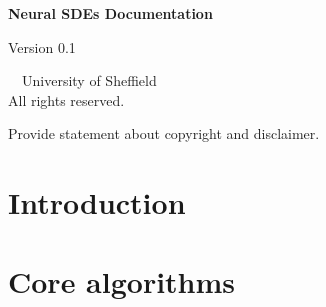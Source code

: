 \documentclass[11pt,a4paper,oneside]{report}
\newcommand{\cleartoleftpage}{%
  \clearpage
  \ifodd\value{page}\hbox{}\newpage\fi
}
\begin{document}
\begin{titlepage}
    \centering
    \vspace*{4cm}
    {\Huge\bfseries Neural SDEs Documentation\par}
    \vspace{1cm}
    {\Large Version 0.1\par}
    \vfill
    {\Large\textcopyright~\the\year~University of Sheffield\\
    All rights reserved.\par}
    \vspace{0.5cm}
\end{titlepage}

\cleartoleftpage

\thispagestyle{empty}
\vspace*{\fill}
\noindent
Provide statement about copyright and disclaimer.
\cleartoleftpage

\tableofcontents
\cleartoleftpage

\listoffigures
\cleartoleftpage

\chapter{Introduction}

\chapter{Core algorithms}

\begin{algorithm}[H]
\caption{Example Sorting Algorithm}
\end{algorithm}

\cleartoleftpage



\cleartoleftpage

\printindex
\cleartoleftpage
\end{document}
